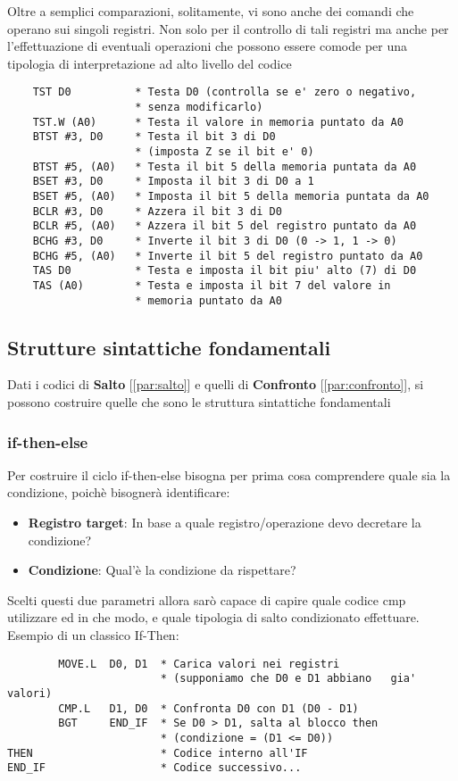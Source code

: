 Oltre a semplici comparazioni, solitamente, vi sono anche dei comandi che operano sui singoli registri. Non solo per il controllo di tali registri ma anche per l'effettuazione di eventuali operazioni che possono essere comode per una tipologia di interpretazione ad alto livello del codice
\begin{lstlisting}
    TST D0          * Testa D0 (controlla se e' zero o negativo, 
                    * senza modificarlo)
    TST.W (A0)      * Testa il valore in memoria puntato da A0
    BTST #3, D0     * Testa il bit 3 di D0 
                    * (imposta Z se il bit e' 0)
    BTST #5, (A0)   * Testa il bit 5 della memoria puntata da A0
    BSET #3, D0     * Imposta il bit 3 di D0 a 1
    BSET #5, (A0)   * Imposta il bit 5 della memoria puntata da A0
    BCLR #3, D0     * Azzera il bit 3 di D0
    BCLR #5, (A0)   * Azzera il bit 5 del registro puntato da A0
    BCHG #3, D0     * Inverte il bit 3 di D0 (0 -> 1, 1 -> 0)
    BCHG #5, (A0)   * Inverte il bit 5 del registro puntato da A0
    TAS D0          * Testa e imposta il bit piu' alto (7) di D0
    TAS (A0)        * Testa e imposta il bit 7 del valore in 
                    * memoria puntato da A0
\end{lstlisting}

\subsection{Strutture sintattiche fondamentali}
Dati i codici di \textbf{Salto} [\ref{par:salto}] e quelli di \textbf{Confronto} [\ref{par:confronto}], si possono costruire quelle che sono le struttura sintattiche fondamentali

\subsubsection{if-then-else}
Per costruire il ciclo if-then-else bisogna per prima cosa comprendere quale sia la condizione, poichè bisognerà identificare:
\begin{itemize}
    \item \textbf{Registro target}: In base a quale registro/operazione devo decretare la condizione?
    \item \textbf{Condizione}: Qual'è la condizione da rispettare?
\end{itemize}

Scelti questi due parametri allora sarò capace di capire quale codice cmp utilizzare ed in che modo, e quale tipologia di salto condizionato effettuare.
Esempio di un classico If-Then:
\begin{lstlisting}
        MOVE.L  D0, D1  * Carica valori nei registri 
                        * (supponiamo che D0 e D1 abbiano   gia' valori)
        CMP.L   D1, D0  * Confronta D0 con D1 (D0 - D1)
        BGT     END_IF  * Se D0 > D1, salta al blocco then 
                        * (condizione = (D1 <= D0))
THEN                    * Codice interno all'IF
END_IF                  * Codice successivo...
\end{lstlisting}

